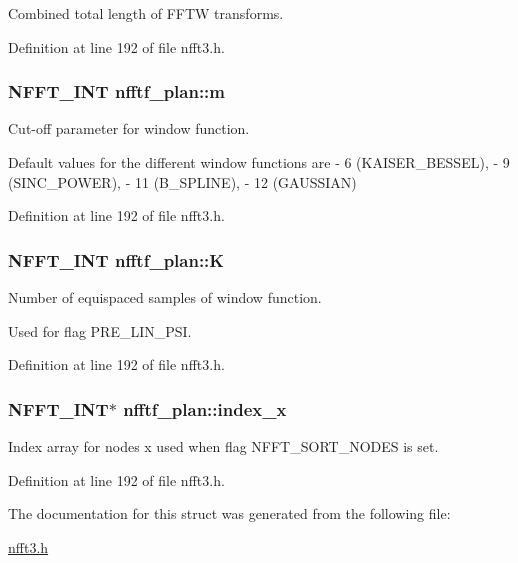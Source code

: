 Combined total length of F\-F\-T\-W transforms. 



Definition at line 192 of file nfft3.\-h.

\hypertarget{structnfftf__plan_a693155aad31ca629ab9ba72815e1441c}{
\subsubsection[{m}]{\setlength{\rightskip}{0pt plus 5cm}N\-F\-F\-T\-\_\-\-I\-N\-T nfftf\-\_\-plan\-::m}}\label{structnfftf__plan_a693155aad31ca629ab9ba72815e1441c}


Cut-\/off parameter for window function. 

Default values for the different window functions are -\/ 6 (K\-A\-I\-S\-E\-R\-\_\-\-B\-E\-S\-S\-E\-L), -\/ 9 (S\-I\-N\-C\-\_\-\-P\-O\-W\-E\-R), -\/ 11 (B\-\_\-\-S\-P\-L\-I\-N\-E), -\/ 12 (G\-A\-U\-S\-S\-I\-A\-N) 

Definition at line 192 of file nfft3.\-h.

\hypertarget{structnfftf__plan_ac66468ce54f091334ae0baffe42135a5}{
\subsubsection[{K}]{\setlength{\rightskip}{0pt plus 5cm}N\-F\-F\-T\-\_\-\-I\-N\-T nfftf\-\_\-plan\-::\-K}}\label{structnfftf__plan_ac66468ce54f091334ae0baffe42135a5}


Number of equispaced samples of window function. 

Used for flag P\-R\-E\-\_\-\-L\-I\-N\-\_\-\-P\-S\-I. 

Definition at line 192 of file nfft3.\-h.

\hypertarget{structnfftf__plan_a1f36e4a372c3fee7b3b2a1ddc0bd889a}{
\subsubsection[{index\-\_\-x}]{\setlength{\rightskip}{0pt plus 5cm}N\-F\-F\-T\-\_\-\-I\-N\-T$\ast$ nfftf\-\_\-plan\-::index\-\_\-x}}\label{structnfftf__plan_a1f36e4a372c3fee7b3b2a1ddc0bd889a}


Index array for nodes x used when flag N\-F\-F\-T\-\_\-\-S\-O\-R\-T\-\_\-\-N\-O\-D\-E\-S is set. 



Definition at line 192 of file nfft3.\-h.



The documentation for this struct was generated from the following file\-:\begin{DoxyCompactItemize}
\item 
\hyperlink{nfft3_8h}{nfft3.\-h}\end{DoxyCompactItemize}
